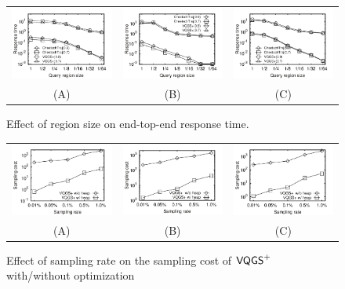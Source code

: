 \begin{figure}
	\centering
	\small
	\begin{tabular}{ccc}
		\includegraphics[width=0.28\linewidth]{pictures/quantitative_study/size_porto_t}
		&
		\includegraphics[width=0.28\linewidth]{pictures/quantitative_study/size_sz_t}
		&
		\includegraphics[width=0.28\linewidth]{pictures/quantitative_study/size_cd_t}
		\\
		(A) \pt{}
		&
		(B) \sz{}
		&
		(C) \cd{}
	\end{tabular}
    \trim
	\caption{Effect of region size on end-top-end response time.}
	\label{fig:size_responsetime}
	\trim \trim
\end{figure}


\begin{figure}
	\centering
	\small
	\begin{tabular}{ccc}
		\includegraphics[width=0.28\linewidth]{pictures/quantitative_study/vqgs_porto_t}
		&
		\includegraphics[width=0.28\linewidth]{pictures/quantitative_study/vqgs_sz_t}
		&
		\includegraphics[width=0.28\linewidth]{pictures/quantitative_study/vqgs_cd_t}
		\\
		(A) \pt{}
		&
		(B) \sz{}
		&
		(C) \cd{}
	\end{tabular}
    \trim
	\caption{Effect of sampling rate on the sampling cost of $\mathsf{VQGS}^+$ with/without optimization}
	\label{fig:rate_algtime}
	\trim \trim
\end{figure}

